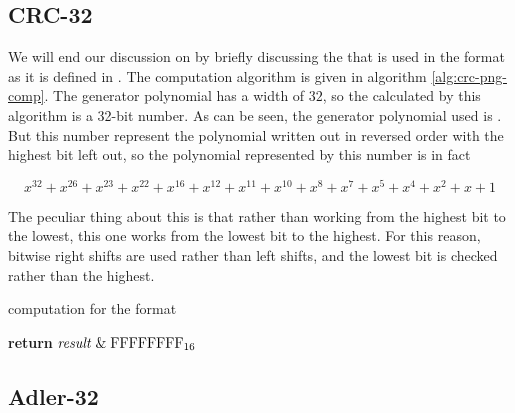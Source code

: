\subsection{CRC-32}
\label{sec:pngcrc}

We will end our discussion on \crc by briefly discussing the \crc that
is used in the \png format as it is defined in
\cite{boutel:_png_portab_networ_graph_specif_version12}. The \crc
computation algorithm is given in algorithm
\ref{alg:crc-png-comp}. The generator polynomial has a width of $32$,
so the \crc calculated by this algorithm is a 32-bit number. As can be
seen, the generator polynomial used is . But this number
represent the polynomial written out in reversed order with the highest bit
left out, so the polynomial represented by this number is in fact

\begin{equation*}
  x^{32} + x^{26} + x^{23} + x^{22} + x^{16} + x^{12} + x^{11} + x^{10} + x^8 + x^7 + x^5 + x^4 + x^2 + x + 1
\end{equation*}

The peculiar thing about this \crc is that rather than working from the
highest bit to the lowest, this one works from the lowest bit to the
highest. For this reason, bitwise right shifts are used rather than
left shifts, and the lowest bit is checked rather than the
highest.

\begin{algorithm}[H]
  \caption{\crc computation for the \png format}
  \label{alg:crc-png-comp}
  \begin{algorithmic}[1]


    \Else
    \EndIf
    \EndRepeatn

    \EndForEach

    \State \textbf{return}  $\mathit{result} \mathrel{\&} \mbox{\ensuremath{\mathrm{FFFFFFFF}_{16}}}$
    \EndProcedure

  \end{algorithmic}
\end{algorithm}


\subsection{Adler-32}
\label{sec:adler32}

